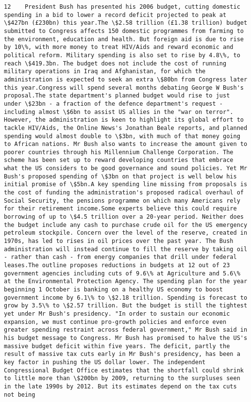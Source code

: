 \documentclass[11pt]{article}
\begin{document}
\begin{Verbatim}[commandchars=\\\{\}]
         12    President Bush has presented his 2006 budget, cutting domestic spending in a bid to lower a record deficit projected to peak at \$427bn (£230bn) this year.The \$2.58 trillion (£1.38 trillion) budget submitted to Congress affects 150 domestic programmes from farming to the environment, education and health. But foreign aid is due to rise by 10\%, with more money to treat HIV/Aids and reward economic and political reform. Military spending is also set to rise by 4.8\%, to reach \$419.3bn. The budget does not include the cost of running military operations in Iraq and Afghanistan, for which the administration is expected to seek an extra \$80bn from Congress later this year.Congress will spend several months debating George W Bush's proposal.The state department's planned budget would rise to just under \$23bn - a fraction of the defence department's request - including almost \$6bn to assist US allies in the "war on terror". However, the administration is keen to highlight its global effort to tackle HIV/Aids, the Online News's Jonathan Beale reports, and planned spending would almost double to \$3bn, with much of that money going to African nations. Mr Bush also wants to increase the amount given to poorer countries through his Millennium Challenge Corporation. The scheme has been set up to reward developing countries that embrace what the US considers to be good governance and sound policies. Yet Mr Bush's proposed spending of \$3bn on that project is well below his initial promise of \$5bn.A key spending line missing from proposals is the cost of funding the administration's proposed radical overhaul of Social Security, the pensions programme on which many Americans rely for their retirement income.Some experts believe this could require borrowing of up to \$4.5 trillion over a 20-year period. Neither does the budget include any cash to purchase crude oil for the US emergency petroleum stockpile. Concern over the level of the reserve, created in 1970s, has led to rises in oil prices over the past year. The Bush administration will instead continue to fill the reserve by taking oil - rather than cash - from energy companies that drill under federal leases.The outline proposes reductions in budgets at 12 out of 23 government agencies including cuts of 9.6\% at Agriculture and 5.6\% at the Environmental Protection Agency. The spending plan for the year beginning 1 October is banking on a healthy US economy to boost government income by 6.1\% to \$2.18 trillion. Spending is forecast to grow by 3.5\% to \$2.57 trillion. But the budget is still the tightest yet under Mr Bush's presidency. "In order to sustain our economic expansion, we must continue pro-growth policies and enforce even greater spending restraint across federal government," Mr Bush said in his budget message to Congress. Mr Bush has promised to halve the US's massive budget deficit within five years. The deficit, partly the result of massive tax cuts early in Mr Bush's presidency, has been a key factor in pushing the US dollar lower. The independent Congressional Budget Office estimates that the shortfall could shrink to little more than \$200bn by 2009, returning to the surpluses seen in the late 1990s by 2012. But its estimates depend on the tax cuts not being 
\end{Verbatim}
\end{document}
